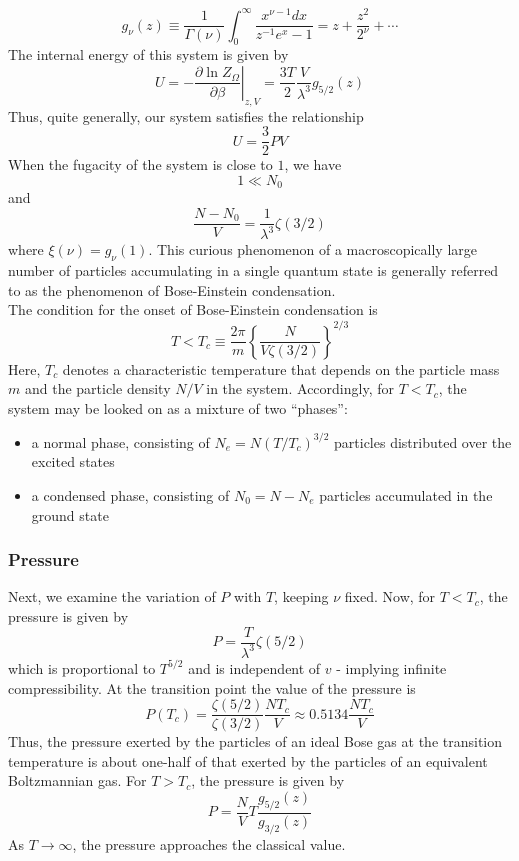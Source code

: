 \[g_{\nu}(z) \equiv \frac{1}{\Gamma(\nu)} \int_{0}^{\infty} \frac{x^{\nu-1}dx}{z^{-1}e^x -1} = z + \frac{z^2}{2^{\nu}} + \cdots\]
The internal energy of this system is given by
\[U = - \left. \frac{\partial \ln Z_{\Omega}}{\partial \beta} \right|_{z,V} = \frac{3T}{2} \frac{V}{\lambda^3} g_{5/2}(z)\]
Thus, quite generally, our system satisfies the relationship
\[U = \frac{3}{2}PV\]
When the fugacity of the system is close to $1$, we have 
\[1 \ll N_0\]
and
\[\frac{N - N_0}{V} = \frac{1}{\lambda^3}\zeta(3/2) \] where $\xi(\nu) = g_{\nu}(1)$.
This curious phenomenon of a macroscopically large number of particles accumulating in a single quantum state is generally referred to as the phenomenon of Bose-Einstein condensation.
\\
The condition for the onset of Bose-Einstein condensation is
\[T < T_c \equiv \frac{2\pi}{m} \left\{ \frac{N}{V\zeta(3/2)} \right\}^{2/3}\]
Here, $T_c$ denotes a characteristic temperature that depends on the particle mass $m$ and the particle density $N/V$ in the system. Accordingly, for $T < T_c$, the system may be looked on as a mixture of two ``phases'':
\begin{itemize}
\item a normal phase, consisting of $N_e = N(T/T_c)^{3/2}$ particles distributed over the excited states
\item a condensed phase, consisting of $N_0 = N - N_e$ particles accumulated in the ground state
\end{itemize}

\subsubsection{Pressure}
Next, we examine the variation of $P$ with $T$, keeping $\nu$ fixed. Now, for $T < T_c$, the pressure is given by
\[P = \frac{T}{\lambda^3}\zeta(5/2)\]
which is proportional to $T^{5/2}$ and is independent of $v$ - implying infinite compressibility.
At the transition point the value of the pressure is
\[P(T_c) = \frac{\zeta(5/2)}{\zeta(3/2)} \frac{NT_c}{V} \approx 0.5134 \frac{NT_c}{V}\]
Thus, the pressure exerted by the particles of an ideal Bose gas at the transition temperature is about one-half of that exerted by the particles of an equivalent Boltzmannian gas. For $T > T_c$, the pressure is given by
\[P = \frac{N}{V}T \frac{g_{5/2}(z)}{g_{3/2}(z)}\]
As $T \to \infty$, the pressure approaches the classical value.

